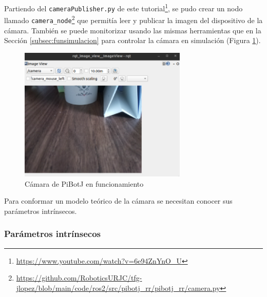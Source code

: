  



Partiendo del \verb|cameraPublisher.py| de este tutorial\footnote{\url{https://www.youtube.com/watch?v=6e94ZnYnO_U}}, se pudo crear un nodo llamado \verb|camera_node|\footnote{\url{https://github.com/RoboticsURJC/tfg-jlopez/blob/main/code/ros2/src/pibotj_rr/pibotj_rr/camera.py}} que permitía leer y publicar la imagen del dispositivo de la cámara. También se puede monitorizar usando las mismas herramientas que en la Sección \ref{subsec:funsimulacion} para controlar la cámara en simulación (Figura \ref{fig:camararr}).

 \begin{figure} [h!]
	\begin{center}
		\includegraphics[width=8cm]{figs/cap6/camerarr.png}
	\end{center}
	\caption{Cámara de PiBotJ en funcionamiento}
	\label{fig:camararr}
\end{figure}

Para conformar un modelo teórico de la cámara se necesitan conocer sus parámetros intrínsecos.

\subsubsection{Parámetros intrínsecos}
\label{subsubsec:intrinsecoscamara}

